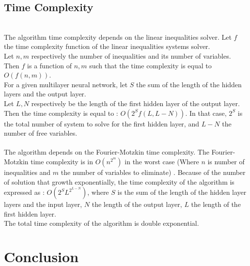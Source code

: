 \documentclass{article}
\begin{document}
\subsection{Time Complexity}\
\\
The algorithm time complexity depends on the linear inequalities solver. Let $f$ the time complexity function of the linear inequalities systems solver.\\
Let $n,m$ respectively the number of inequalities and its number of variables. Then $f$ is a function of $n,m$ such that the time complexity is equal to 
$O(f(n,m))$.\\
For a given multilayer neural network, let $S$ the sum of the length of the hidden layers and the output layer.\\
Let $L,N$ respectively be the length of the first hidden layer of the output layer.\\
Then the time complexity is equal to : $ O(2^{S}f(L,L-N))$. In that case, $ 2^{S}$ is the total number of system to solve for the first hidden layer, and
$L-N$ the number of free variables.\\\\

The algorithm depends on the Fourier-Motzkin time complexity. The Fourier-Motzkin time complexity is in $O(n^{2^{m}})$ in the worst case
(Where $n$ is number of inequalities and $m$ the number of variables to eliminate) \cite{motzkin1952theory}. Because of the number of solution that growth 
exponentially, the time complexity of the algorithm is expressed as : $O(2^{S}L^{2^{L-N}})$, where $S$ is the sum of the length of the hidden layer layers
and the input layer, $N$ the length of the output layer, $L$ the length of the first hidden layer.\\
The total time complexity of the algorithm is double exponential.
\newpage
\section{Conclusion}
\end{document}

